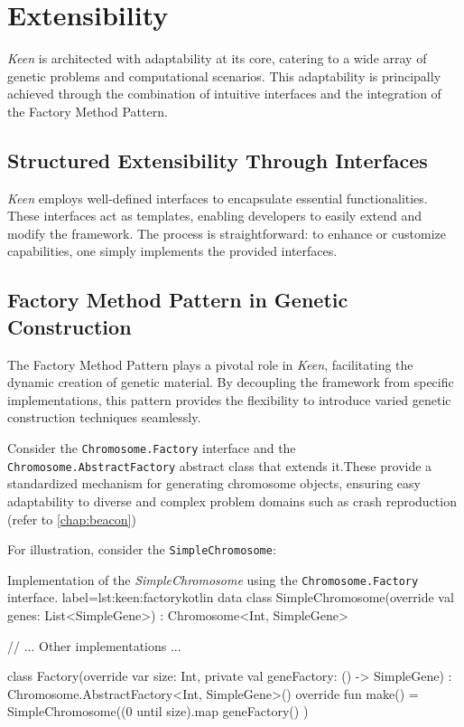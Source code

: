 \section{Extensibility}
\label{sec:keen:extensibility}

  \textit{Keen} is architected with adaptability at its core, catering to a 
  wide array of genetic problems and computational scenarios. This adaptability 
  is principally achieved through the combination of intuitive interfaces and 
  the integration of the Factory Method Pattern.

  \subsection{Structured Extensibility Through Interfaces}
    \textit{Keen} employs well-defined interfaces to encapsulate essential 
    functionalities. These interfaces act as templates, enabling developers to 
    easily extend and modify the framework. The process is straightforward: to 
    enhance or customize capabilities, one simply implements the provided 
    interfaces.

  \subsection{Factory Method Pattern in Genetic Construction}
    The Factory Method Pattern plays a pivotal role in \textit{Keen}, 
    facilitating the dynamic creation of genetic material. By decoupling the 
    framework from specific implementations, this pattern provides the 
    flexibility to introduce varied genetic construction techniques seamlessly.

    Consider the \texttt{Chromosome.Factory} interface and the 
    \texttt{Chromosome.AbstractFactory} abstract class that extends it.These 
    provide a standardized mechanism for generating chromosome objects, ensuring
    easy adaptability to diverse and complex problem domains such as crash
    reproduction (refer to \vref{chap:beacon})

    For illustration, consider the \texttt{SimpleChromosome}:

    \begin{code}{
      Implementation of the \textit{SimpleChromosome} using the 
      \texttt{Chromosome.Factory} interface.
    }{label=lst:keen:factory}{kotlin}
      data class SimpleChromosome(override val genes: List<SimpleGene>) :
          Chromosome<Int, SimpleGene> {
          // ... Other implementations ...

          class Factory(override var size: Int, private val geneFactory: () -> SimpleGene) :
              Chromosome.AbstractFactory<Int, SimpleGene>() {
              override fun make() = SimpleChromosome((0 until size).map { geneFactory() })
          }
      }
    \end{code}

